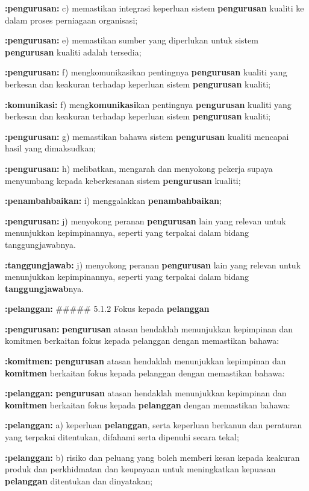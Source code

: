 \documentclass{article}
\begin{document}
\textbf{:pengurusan:} c) memastikan integrasi keperluan sistem \textbf{pengurusan} kualiti ke dalam proses perniagaan
organisasi;

\textbf{:pengurusan:} e) memastikan sumber yang diperlukan untuk sistem \textbf{pengurusan} kualiti adalah tersedia;

\textbf{:pengurusan:} f) mengkomunikasikan pentingnya \textbf{pengurusan} kualiti yang berkesan dan keakuran
terhadap keperluan sistem \textbf{pengurusan} kualiti;

\textbf{:komunikasi:} f) meng\textbf{komunikasi}kan pentingnya \textbf{pengurusan} kualiti yang berkesan dan keakuran
terhadap keperluan sistem \textbf{pengurusan} kualiti;

\textbf{:pengurusan:} g) memastikan bahawa sistem \textbf{pengurusan} kualiti mencapai hasil yang dimaksudkan;

\textbf{:pengurusan:} h) melibatkan, mengarah dan menyokong pekerja supaya menyumbang kepada
keberkesanan sistem \textbf{pengurusan} kualiti;

\textbf{:penambahbaikan:} i) menggalakkan \textbf{penambahbaikan};

\textbf{:pengurusan:} j) menyokong peranan \textbf{pengurusan} lain yang relevan untuk menunjukkan kepimpinannya,
seperti yang terpakai dalam bidang tanggungjawabnya.

\textbf{:tanggungjawab:} j) menyokong peranan \textbf{pengurusan} lain yang relevan untuk menunjukkan kepimpinannya,
seperti yang terpakai dalam bidang \textbf{tanggungjawab}nya.

\textbf{:pelanggan:} \#\#\#\#\# 5.1.2 Fokus kepada \textbf{pelanggan}

\textbf{:pengurusan:} \textbf{pengurusan} atasan hendaklah menunjukkan kepimpinan dan komitmen berkaitan fokus
kepada pelanggan dengan memastikan bahawa:

\textbf{:komitmen:} \textbf{pengurusan} atasan hendaklah menunjukkan kepimpinan dan \textbf{komitmen} berkaitan fokus
kepada pelanggan dengan memastikan bahawa:

\textbf{:pelanggan:} \textbf{pengurusan} atasan hendaklah menunjukkan kepimpinan dan \textbf{komitmen} berkaitan fokus
kepada \textbf{pelanggan} dengan memastikan bahawa:

\textbf{:pelanggan:} a) keperluan \textbf{pelanggan}, serta keperluan berkanun dan peraturan yang terpakai ditentukan,
difahami serta dipenuhi secara tekal;

\textbf{:pelanggan:} b) risiko dan peluang yang boleh memberi kesan kepada keakuran produk dan
perkhidmatan dan keupayaan untuk meningkatkan kepuasan \textbf{pelanggan} ditentukan dan
dinyatakan;
\end{document}

